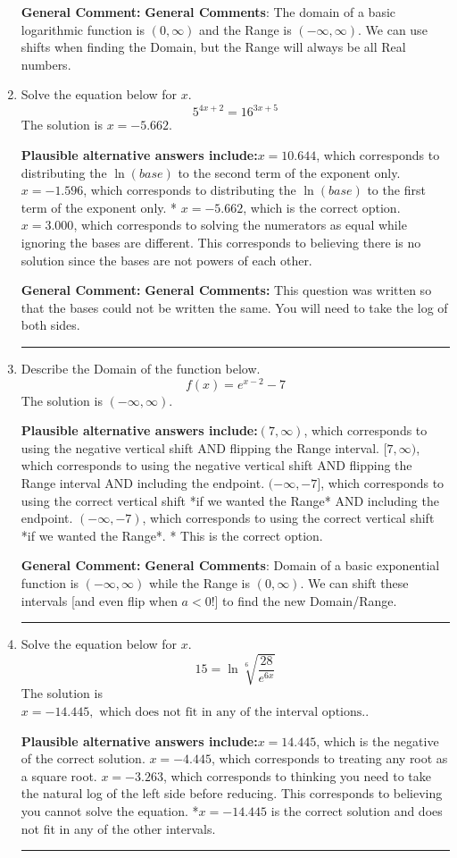 \documentclass{extbook}[14pt]
\newcommand{\litem}[1]{\item #1

\rule{\textwidth}{0.4pt}}
\begin{document}
\begin{enumerate}
{\textbf{General Comment:} \textbf{General Comments}: The domain of a basic logarithmic function is $(0, \infty)$ and the Range is $(-\infty, \infty)$. We can use shifts when finding the Domain, but the Range will always be all Real numbers.
}
\litem{
Solve the equation below for $x$.
\[ 5^{4x+2} = 16^{3x+5} \]The solution is \( x = -5.662 \).\begin{enumerate}[label=\Alph*.]
\textbf{Plausible alternative answers include:}$x = 10.644$, which corresponds to distributing the $\ln(base)$ to the second term of the exponent only.
$x = -1.596$, which corresponds to distributing the $\ln(base)$ to the first term of the exponent only.
* $x = -5.662$, which is the correct option.
$x = 3.000$, which corresponds to solving the numerators as equal while ignoring the bases are different.
This corresponds to believing there is no solution since the bases are not powers of each other.
\end{enumerate}

\textbf{General Comment:} \textbf{General Comments:} This question was written so that the bases could not be written the same. You will need to take the log of both sides.
}
\litem{
Describe the Domain of the function below.
\[ f(x) = e^{x-2}-7 \]The solution is \( (-\infty, \infty) \).\begin{enumerate}[label=\Alph*.]
\textbf{Plausible alternative answers include:}$(7, \infty)$, which corresponds to using the negative vertical shift AND flipping the Range interval.
$[7, \infty)$, which corresponds to using the negative vertical shift AND flipping the Range interval AND including the endpoint.
$(-\infty, -7]$, which corresponds to using the correct vertical shift *if we wanted the Range* AND including the endpoint.
$(-\infty, -7)$, which corresponds to using the correct vertical shift *if we wanted the Range*.
* This is the correct option.
\end{enumerate}

\textbf{General Comment:} \textbf{General Comments}: Domain of a basic exponential function is $(-\infty, \infty)$ while the Range is $(0, \infty)$. We can shift these intervals [and even flip when $a<0$!] to find the new Domain/Range.
}
\litem{
Solve the equation below for $x$.
\[  15 = \ln{\sqrt[6]{\frac{28}{e^{6x}}}} \]The solution is \( x = -14.445, \text{ which does not fit in any of the interval options.} \).\begin{enumerate}[label=\Alph*.]
\textbf{Plausible alternative answers include:}$x = 14.445$, which is the negative of the correct solution.
$x = -4.445$, which corresponds to treating any root as a square root.
$x = -3.263$, which corresponds to thinking you need to take the natural log of the left side before reducing.
This corresponds to believing you cannot solve the equation.
*$x = -14.445$ is the correct solution and does not fit in any of the other intervals.
\end{enumerate}

}
\end{enumerate}
\end{document}

